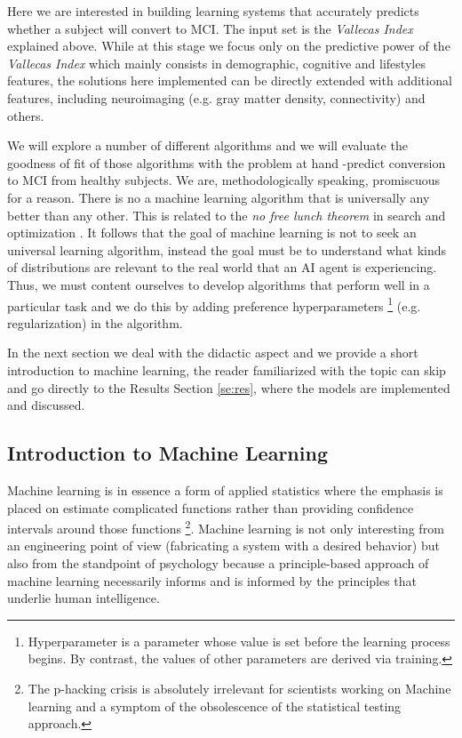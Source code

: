 \documentclass[11pt]{article}
\theoremstyle{definition}
\theoremstyle{remark}
\begin{document}
Here we are interested in building learning systems that accurately predicts whether a subject will convert to MCI. The input set is the \emph{Vallecas Index} explained above. While at this stage we focus only on the predictive power of the \emph{Vallecas Index} which mainly consists in demographic, cognitive and lifestyles features, the solutions here implemented can be directly extended with additional features, including neuroimaging (e.g. gray matter density, connectivity) and others.

We will explore a number of different algorithms and we will evaluate the goodness of fit of those algorithms with the problem at hand -predict conversion to MCI from healthy subjects. We are, methodologically speaking, promiscuous for a reason. There is no a machine learning algorithm that is universally any better than any other. This is related to the \emph{no free lunch theorem} in search and optimization \cite{wolpert1997no}. It follows that the goal of machine learning is not to seek an universal learning algorithm, instead the goal must be to understand what kinds of distributions are relevant to the real world that an AI agent is experiencing. Thus, we must content ourselves to develop algorithms that perform well in a particular task and we do this by adding preference hyperparameters \footnote{Hyperparameter is a parameter whose value is set before the learning process begins. By contrast, the values of other parameters are derived via training.} (e.g. regularization) in the algorithm.  

In the next section we deal with the didactic aspect and we provide a short introduction to machine learning, the reader familiarized with the topic can skip and go directly to the Results Section \ref{se:res}, where the models are implemented and discussed. 

\subsection{Introduction to Machine Learning} 
\label{sse:iml}
Machine learning is in essence a form of applied statistics where the emphasis is placed on estimate complicated functions rather than providing confidence intervals around those functions \footnote{The p-hacking crisis is absolutely irrelevant for scientists working on Machine learning and a symptom of the obsolescence of the statistical testing approach.}. Machine learning is not only interesting from an engineering point of view (fabricating a system with a desired behavior) but also from the standpoint of psychology because a principle-based approach of machine learning necessarily informs and is informed by the principles that underlie human intelligence.
\end{document}
